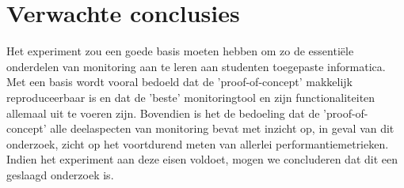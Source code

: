 \section{Verwachte conclusies}
\label{sec:verwachte_conclusies}

Het experiment zou een goede basis moeten hebben om zo de essentiële onderdelen van monitoring aan te leren aan studenten toegepaste informatica. Met een basis wordt vooral bedoeld dat de 'proof-of-concept' makkelijk reproduceerbaar is en dat de 'beste' monitoringtool en zijn functionaliteiten allemaal uit te voeren zijn. Bovendien is het de bedoeling dat de 'proof-of-concept' alle deelaspecten van monitoring bevat met inzicht op, in geval van dit onderzoek, zicht op het voortdurend meten van allerlei performantiemetrieken. Indien het experiment aan deze eisen voldoet, mogen we concluderen dat dit een geslaagd onderzoek is.

